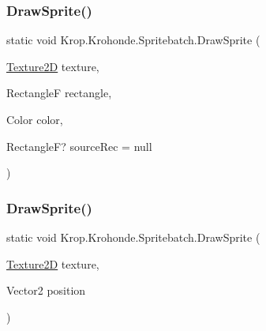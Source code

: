 \subsubsection{\texorpdfstring{Draw\+Sprite()}{DrawSprite()}\hspace{0.1cm}{\footnotesize\ttfamily [2/6]}}
{\footnotesize\ttfamily static void Krop.\+Krohonde.\+Spritebatch.\+Draw\+Sprite (\begin{DoxyParamCaption}\item[{\mbox{\hyperlink{class_krop_1_1_krohonde_1_1_texture2_d}{Texture2D}}}]{texture,  }\item[{RectangleF}]{rectangle,  }\item[{Color}]{color,  }\item[{RectangleF?}]{source\+Rec = {\ttfamily null} }\end{DoxyParamCaption})\hspace{0.3cm}{\ttfamily [static]}}

\mbox{\label{class_krop_1_1_krohonde_1_1_spritebatch_a6e80cba942888ba405410ce5361b550c}} 
\subsubsection{\texorpdfstring{Draw\+Sprite()}{DrawSprite()}\hspace{0.1cm}{\footnotesize\ttfamily [3/6]}}
{\footnotesize\ttfamily static void Krop.\+Krohonde.\+Spritebatch.\+Draw\+Sprite (\begin{DoxyParamCaption}\item[{\mbox{\hyperlink{class_krop_1_1_krohonde_1_1_texture2_d}{Texture2D}}}]{texture,  }\item[{Vector2}]{position }\end{DoxyParamCaption})\hspace{0.3cm}{\ttfamily [static]}}

\mbox{\label{class_krop_1_1_krohonde_1_1_spritebatch_ab4a2ef07acfe42c03b8de094bd499197}} 

